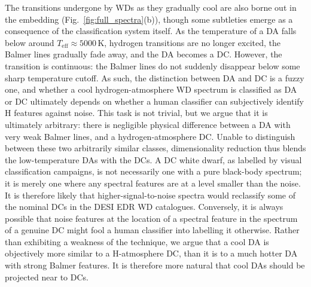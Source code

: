 \documentclass[fleqn,usenatbib]{mnras}
\def\Teff{T_\mathrm{eff}}
\begin{document}
The transitions undergone by WDs as they gradually cool are also borne out in the embedding (Fig.~\ref{fig:full_spectra}(b)), though some subtleties emerge as a consequence of the classification system itself.
As the temperature of a DA falls below around $\Teff\approx 5000\,\text{K}$, hydrogen transitions are no longer excited, the Balmer lines gradually fade away, and the DA becomes a DC.
However, the transition is continuous: the Balmer lines do not suddenly disappear below some sharp temperature cutoff.
As such, the distinction between DA and DC is a fuzzy one, and whether a cool hydrogen-atmosphere WD spectrum is classified as DA or DC ultimately depends on whether a human classifier can subjectively identify H features against noise.
This task is not trivial, but we argue that it is ultimately arbitrary: there is negligible physical difference between a DA with very weak Balmer lines, and a hydrogen-atmosphere DC.
Unable to distinguish between these two arbitrarily similar classes, dimensionality reduction thus blends the low-temperature DAs with the DCs.
A DC white dwarf, as labelled by visual classification campaigns, is not necessarily one with a pure black-body spectrum; it is merely one where any spectral features are at a level smaller than the noise.
It is therefore likely that higher-signal-to-noise spectra would reclassify some of the nominal DCs in the DESI EDR WD catalogues.
Conversely, it is always possible that noise features at the location of a spectral feature in the spectrum of a genuine DC might fool a human classifier into labelling it otherwise.
Rather than exhibiting a weakness of the technique, we argue that a cool DA is objectively more similar to a H-atmosphere DC, than it is to a much hotter DA with strong Balmer features.
It is therefore more natural that cool DAs should be projected near to DCs.

\end{document}
